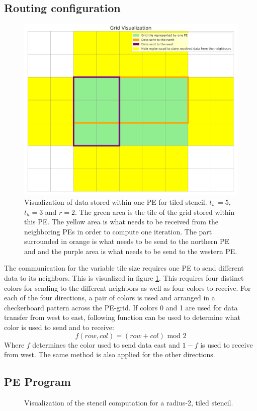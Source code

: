 \documentclass{article}
\newcommand{\m}{\text{ mod }}
\begin{document}
\subsection{Routing configuration}
\begin{figure}
    \centering
    \includegraphics[width=0.5\linewidth]{plots/grid_visualization.png}
    \caption{Visualization of data stored within one PE for tiled stencil. $t_w=5$, $t_h=3$ and $r=2$. The green area is the tile of the grid stored within this PE. The yellow area is what needs to be received from the neighboring PEs in order to compute one iteration. The part surrounded in orange is what needs to be send to the northern PE and and the purple area is what needs to be send to the western PE.}
    \label{fig:grid_visualization}
\end{figure}
The communication for the variable tile size requires one PE to send different data to its neighbors. This is visualized in figure \ref{fig:grid_visualization}. This requires four distinct colors for sending to the different neighbors as well as four colors to receive. For each of the four directions, a pair of colors is used and arranged in a checkerboard pattern across the PE-grid.
If colors 0 and 1 are used for data transfer from west to east, following function can be used to determine what color is used to send and to receive:
\begin{equation}
    \label{eq:tiled_coloring_function}
    f(row, col)=(row+col)\m2
\end{equation}
Where $f$ determines the color used to send data east and $1-f$ is used to receive from west. The same method is also applied for the other directions.
\subsection{PE Program}

\begin{figure}
    \centering
    \caption{Visualization of the stencil computation for a radius-2, tiled stencil.}
    \label{fig:stencil_algorithm_animation}
\end{figure}
\end{document}
